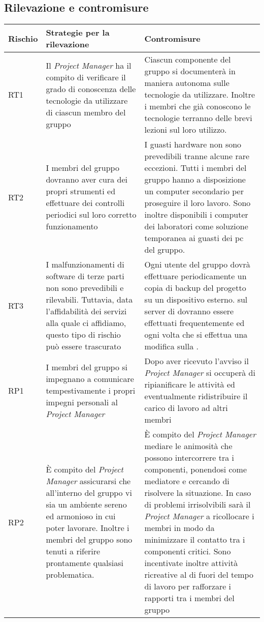 


\subsection{Rilevazione e contromisure}

\begin{longtable}[H]{|l|C{5cm}|C{7cm}|}
		\hline
		\textbf{Rischio} & \textbf{Strategie per la rilevazione}  & \textbf{Contromisure}  \\
		\hline
		RT1     & Il \emph{Project Manager} ha il compito di verificare il grado di conoscenza delle tecnologie da utilizzare di ciascun membro del gruppo & Ciascun componente del gruppo si documenterà in maniera autonoma sulle tecnologie da utilizzare. Inoltre i membri che già conoscono le tecnologie terranno delle brevi lezioni sul loro utilizzo.\\
		\hline
		RT2     & I membri del gruppo dovranno aver cura dei propri strumenti ed effettuare dei controlli periodici sul loro corretto funzionamento & I guasti hardware non sono prevedibili tranne alcune rare eccezioni. Tutti i membri del gruppo hanno a disposizione un computer secondario per proseguire il loro lavoro. Sono inoltre disponibili i computer dei laboratori come soluzione temporanea ai guasti dei pc del gruppo.\\
		\hline
		RT3     & I malfunzionamenti di software di terze parti non sono prevedibili e rilevabili. Tuttavia, data l'affidabilità dei servizi alla quale ci affidiamo, questo tipo di rischio può essere trascurato & Ogni utente del gruppo dovrà effettuare periodicamente un copia di backup del progetto su un dispositivo esterno.  sul server di  dovranno essere effettuati frequentemente ed ogni volta che si effettua una modifica sulla . \\
		\hline
		RP1     & I membri del gruppo si impegnano a comunicare tempestivamente i propri impegni personali al \emph{Project Manager} & Dopo aver ricevuto l'avviso il \emph{Project Manager} si occuperà di ripianificare le attività ed eventualmente ridistribuire il carico di lavoro ad altri membri \\
		\hline
		RP2     & È compito del \emph{Project Manager} assicurarsi che all'interno del gruppo vi sia un ambiente sereno ed armonioso in cui poter lavorare. Inoltre i membri del gruppo sono tenuti a riferire prontamente qualsiasi problematica. & È compito del \emph{Project Manager} mediare le animosità che possono intercorrere tra i componenti, ponendosi come mediatore e cercando di risolvere la situazione. In caso di problemi irrisolvibili sarà il \emph{Project Manager} a ricollocare i membri in modo da minimizzare il contatto tra i componenti critici. Sono incentivate inoltre attività ricreative al di fuori del tempo di lavoro per rafforzare i rapporti tra i membri del gruppo\\

\end{longtable}
